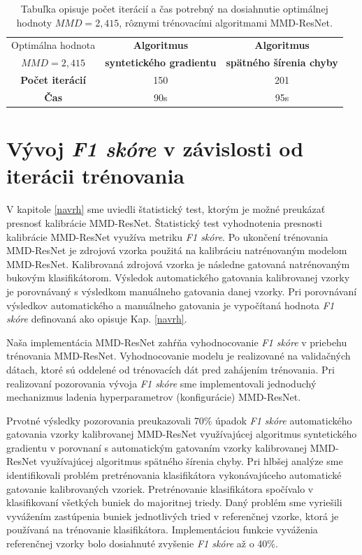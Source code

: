 \begin{table}[h!]
\caption[Dosiahnutie optimálnej hodnoty MMD rôznymi algoritmami trénovania MMD-ResNet]{Tabuľka opisuje počet iterácií a čas potrebný na dosiahnutie optimálnej hodnoty $MMD=2,415$, rôznymi trénovacími algoritmami MMD-ResNet.}
\label{vysledok6b}
\begin{center}
\begin{tabular}{|c|c|c|}
\hline
 Optimálna hodnota & \textbf{Algoritmus} & \textbf{Algoritmus} \\
 $MMD=2,415$ & \textbf{syntetického gradientu} & \textbf{spätného šírenia chyby} \\
\hline
\textbf{Počet iterácií} & 150 & 201 \\
\hline
\textbf{Čas} & 90s & 95s \\
\hline
\end{tabular}%
\end{center}
\end{table}

\section{Vývoj \textit{F1 skóre} v závislosti od iterácii trénovania}

V kapitole \ref{navrh} sme uviedli štatistický test, ktorým je možné preukázať presnosť kalibrácie MMD-ResNet. Štatistický test vyhodnotenia presnosti kalibrácie MMD-ResNet využíva metriku \textit{F1 skóre}. Po ukončení trénovania MMD-ResNet je zdrojová vzorka použitá na kalibráciu natrénovaným modelom MMD-ResNet. Kalibrovaná zdrojová vzorka je následne gatovaná natrénovaným bukovým klasifikátorom. Výsledok automatického gatovania kalibrovanej vzorky je porovnávaný s výsledkom manuálneho gatovania danej vzorky. Pri porovnávaní výsledkov automatického a manuálneho gatovania je vypočítaná hodnota \textit{F1 skóre} definovaná ako opisuje Kap. \ref{navrh}.

Naša implementácia MMD-ResNet zahŕňa vyhodnocovanie \textit{F1 skóre} v priebehu trénovania MMD-ResNet. Vyhodnocovanie modelu je realizované na validačných dátach, ktoré sú oddelené od trénovacích dát pred zahájením trénovania. Pri realizovaní pozorovania vývoja \textit{F1 skóre} sme implementovali jednoduchý mechanizmus ladenia hyperparametrov (konfigurácie) MMD-ResNet.

Prvotné výsledky pozorovania preukazovali 70\% úpadok \textit{F1 skóre} automatického gatovania vzorky kalibrovanej MMD-ResNet využívajúcej algoritmus syntetického gradientu v porovnaní s automatickým gatovaním vzorky kalibrovanej MMD-ResNet využívajúcej algoritmus spätného šírenia chyby. Pri hlbšej analýze sme identifikovali problém pretrénovania klasifikátora vykonávajúceho automatické gatovanie kalibrovaných vzoriek. Pretrénovanie klasifikátora spočívalo v klasifikovaní všetkých buniek do majoritnej triedy. Daný problém sme vyriešili vyvážením zastúpenia buniek jednotlivých tried v referenčnej vzorke, ktorá je používaná na trénovanie klasifikátora. Implementáciou funkcie vyváženia referenčnej vzorky bolo dosiahnuté zvyšenie \textit{F1 skóre} až o 40\%.


